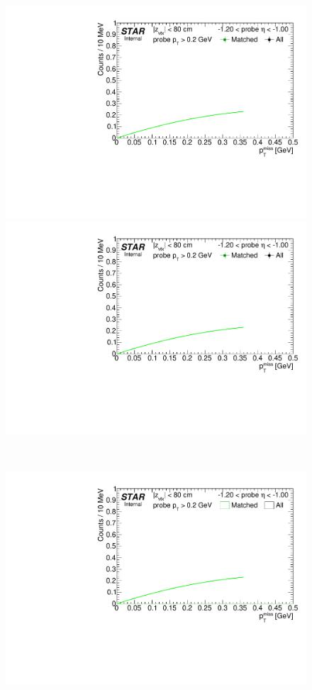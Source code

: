 \begin{figure}[ht]\ContinuedFloat
\centering
\parbox{0.495\textwidth}{
  \centering
  
  \includegraphics[width=\linewidth,page=10]{graphics/systematicsEfficiency/TOF_tagAndProbe/Fitting_effVsEta_data.pdf}\\
  \includegraphics[width=\linewidth,page=11]{graphics/systematicsEfficiency/TOF_tagAndProbe/Fitting_effVsEta_data.pdf}
}~
\parbox{0.495\textwidth}{
  \centering
  \includegraphics[width=\linewidth,page=10]{graphics/systematicsEfficiency/TOF_tagAndProbe/Fitting_effVsEta_mc.pdf}\\
}
\end{figure}

